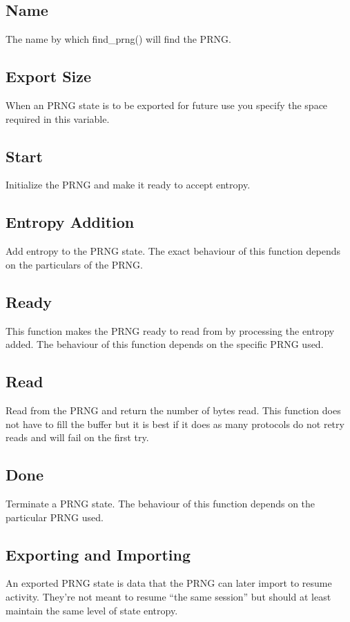 \documentclass[a4paper]{book}
\begin{document}
\subsection{Name}
The name by which find\_prng() will find the PRNG.

\subsection{Export Size}
When an PRNG state is to be exported for future use you specify the space required in this variable.

\subsection{Start}
Initialize the PRNG and make it ready to accept entropy.

\subsection{Entropy Addition}
Add entropy to the PRNG state.  The exact behaviour of this function depends on the particulars of the PRNG.

\subsection{Ready}
This function makes the PRNG ready to read from by processing the entropy added.  The behaviour of this function depends
on the specific PRNG used.

\subsection{Read}
Read from the PRNG and return the number of bytes read.  This function does not have to fill the buffer but it is best 
if it does as many protocols do not retry reads and will fail on the first try.

\subsection{Done}
Terminate a PRNG state.  The behaviour of this function depends on the particular PRNG used.

\subsection{Exporting and Importing}
An exported PRNG state is data that the PRNG can later import to resume activity.  They're not meant to resume ``the same session''
but should at least maintain the same level of state entropy.
\end{document}
